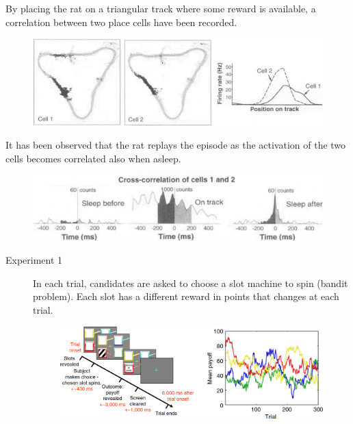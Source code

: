 \begin{description}
\begin{casestudy}
\begin{remark}
            \end{remark}

            By placing the rat on a triangular track where some reward is available, a correlation between two place cells have been recorded.
            \begin{figure}[H]
                \centering
                \includegraphics[width=0.6\linewidth]{./img/hippocampus_replay2.png}
            \end{figure}

            It has been observed that the rat replays the episode as the activation of the two cells becomes correlated also when asleep.
            \begin{figure}[H]
                \centering
                \includegraphics[width=0.6\linewidth]{./img/hippocampus_replay3.png}
            \end{figure}
        \end{casestudy}

        \begin{casestudy}
            \phantom{}
            \begin{description}
                \item[Experiment 1] 
                    In each trial, candidates are asked to choose a slot machine to spin (bandit problem). Each slot has a different reward in points that changes at each trial.
                    \begin{figure}[H]
                        \centering
                        \includegraphics[width=0.55\linewidth]{./img/memory_decision1.png}
                    \end{figure}
        

\end{description}
\end{casestudy}
\end{description}
